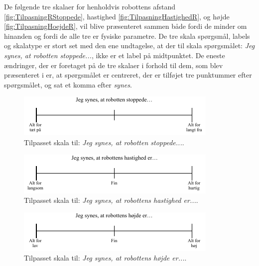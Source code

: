 \noindent
%
De følgende tre skalaer for henholdvis robottens afstand \autoref{fig:TilpasningRStoppede}, hastighed \autoref{fig:TilpasningHastighedR}, og højde \autoref{fig:TilpasningHoejdeR}, vil blive præsenteret sammen både fordi de minder om hinanden og fordi de alle tre er fysiske parametre. De tre skala spørgsmål, labels og skalatype er stort set med den ene undtagelse, at der til skala spørgsmålet: \textit{Jeg synes, at robotten stoppede...}, ikke er et label på midtpunktet. De eneste ændringer, der er foretaget på de tre skalaer i forhold til dem, som blev præsenteret i  er, at spørgsmålet er centreret, der er tilføjet tre punktummer efter spørgsmålet, og sat et komma efter \textit{synes}.
%
\begin{figure}[H]
\centering
\includegraphics[width =\textwidth]{Figure/TilpasningAfSkalaer/TilpassetRStoppede} 
\caption{Tilpasset skala til: \textit{Jeg synes, at robotten stoppede...}.}
\label{fig:TilpasningRStoppede}
\end{figure}
\noindent
%
%
\begin{figure}[H]
\centering
\includegraphics[width =\textwidth]{Figure/TilpasningAfSkalaer/TilpassetHastighedR} 
\caption{Tilpasset skala til: \textit{Jeg synes, at robottens hastighed er...}.}
\label{fig:TilpasningHastighedR}
\end{figure}
\noindent
%
%
\begin{figure}[H]
\centering
\includegraphics[width =\textwidth]{Figure/TilpasningAfSkalaer/TilpassetHoejdeR} 
\caption{Tilpasset skala til: \textit{Jeg synes, at robottens højde er...}.}
\label{fig:TilpasningHoejdeR}
\end{figure}
